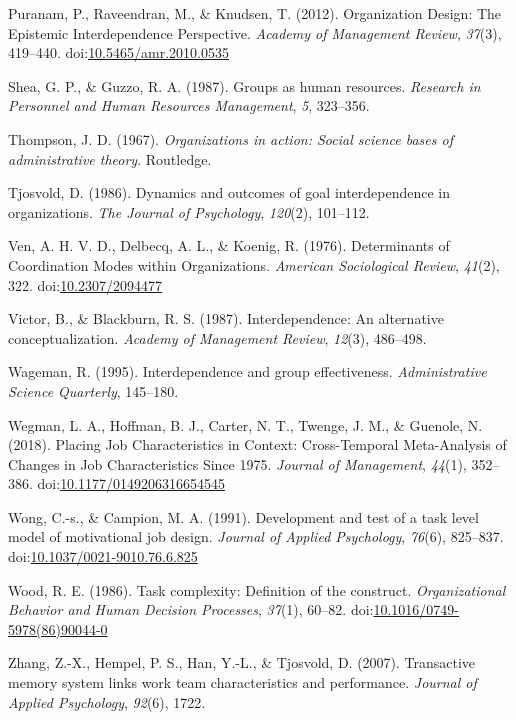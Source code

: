 \documentclass[english,,man]{apa6}
\theoremstyle{definition}
\theoremstyle{definition}
\theoremstyle{definition}
\theoremstyle{remark}
\begin{document}
\leavevmode\hypertarget{ref-puranam_organization_2012}{}%
Puranam, P., Raveendran, M., \& Knudsen, T. (2012). Organization Design:
The Epistemic Interdependence Perspective. \emph{Academy of Management
Review}, \emph{37}(3), 419--440.
doi:\href{https://doi.org/10.5465/amr.2010.0535}{10.5465/amr.2010.0535}

\leavevmode\hypertarget{ref-shea1987groups}{}%
Shea, G. P., \& Guzzo, R. A. (1987). Groups as human resources.
\emph{Research in Personnel and Human Resources Management}, \emph{5},
323--356.

\leavevmode\hypertarget{ref-thompson2017organizations}{}%
Thompson, J. D. (1967). \emph{Organizations in action: Social science
bases of administrative theory}. Routledge.

\leavevmode\hypertarget{ref-tjosvold_dynamics_1986}{}%
Tjosvold, D. (1986). Dynamics and outcomes of goal interdependence in
organizations. \emph{The Journal of Psychology}, \emph{120}(2),
101--112.

\leavevmode\hypertarget{ref-ven_determinants_1976}{}%
Ven, A. H. V. D., Delbecq, A. L., \& Koenig, R. (1976). Determinants of
Coordination Modes within Organizations. \emph{American Sociological
Review}, \emph{41}(2), 322.
doi:\href{https://doi.org/10.2307/2094477}{10.2307/2094477}

\leavevmode\hypertarget{ref-victor_interdependence_1987}{}%
Victor, B., \& Blackburn, R. S. (1987). Interdependence: An alternative
conceptualization. \emph{Academy of Management Review}, \emph{12}(3),
486--498.

\leavevmode\hypertarget{ref-wageman_interdependence_1995}{}%
Wageman, R. (1995). Interdependence and group effectiveness.
\emph{Administrative Science Quarterly}, 145--180.

\leavevmode\hypertarget{ref-wegman_placing_2018}{}%
Wegman, L. A., Hoffman, B. J., Carter, N. T., Twenge, J. M., \& Guenole,
N. (2018). Placing Job Characteristics in Context: Cross-Temporal
Meta-Analysis of Changes in Job Characteristics Since 1975.
\emph{Journal of Management}, \emph{44}(1), 352--386.
doi:\href{https://doi.org/10.1177/0149206316654545}{10.1177/0149206316654545}

\leavevmode\hypertarget{ref-wong_development_1991}{}%
Wong, C.-s., \& Campion, M. A. (1991). Development and test of a task
level model of motivational job design. \emph{Journal of Applied
Psychology}, \emph{76}(6), 825--837.
doi:\href{https://doi.org/10.1037/0021-9010.76.6.825}{10.1037/0021-9010.76.6.825}

\leavevmode\hypertarget{ref-wood_task_1986}{}%
Wood, R. E. (1986). Task complexity: Definition of the construct.
\emph{Organizational Behavior and Human Decision Processes},
\emph{37}(1), 60--82.
doi:\href{https://doi.org/10.1016/0749-5978(86)90044-0}{10.1016/0749-5978(86)90044-0}

\leavevmode\hypertarget{ref-zhang2007transactive}{}%
Zhang, Z.-X., Hempel, P. S., Han, Y.-L., \& Tjosvold, D. (2007).
Transactive memory system links work team characteristics and
performance. \emph{Journal of Applied Psychology}, \emph{92}(6), 1722.
\end{document}
